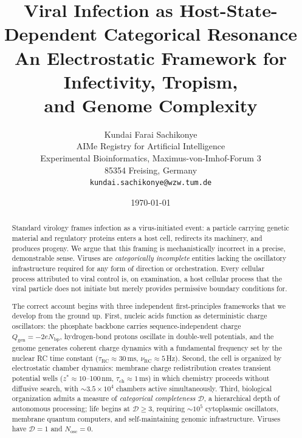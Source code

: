\documentclass[11pt,twocolumn,a4paper]{article}
\title{%
  \textbf{Viral Infection as Host-State-Dependent Categorical Resonance}\\[8pt]
  \large An Electrostatic Framework for Infectivity, Tropism,\\[4pt]
  and Genome Complexity
}
\author{
Kundai Farai Sachikonye\\[0.3em]
AIMe Registry for Artificial Intelligence\\
Experimental Bioinformatics, Maximus-von-Imhof-Forum 3\\
85354 Freising, Germany\\
\texttt{kundai.sachikonye@wzw.tum.de}
}
\date{\today}
\theoremstyle{definition}
\theoremstyle{remark}
\newcommand{\tauRC}{\tau_{\mathrm{RC}}}
\newcommand{\nuRC}{\nu_{\mathrm{RC}}}
\newcommand{\Qgen}{Q_{\mathrm{gen}}}
\newcommand{\Nosc}{N_{\mathrm{osc}}}
\newcommand{\taucham}{\tau_{\mathrm{ch}}}
\newcommand{\zstar}{z^{*}}
\begin{document}

\maketitle
\thispagestyle{empty}

\begin{abstract}
Standard virology frames infection as a virus-initiated event: a particle carrying genetic material and regulatory proteins enters a host cell, redirects its machinery, and produces progeny. We argue that this framing is mechanistically incorrect in a precise, demonstrable sense. Viruses are \emph{categorically incomplete} entities lacking the oscillatory infrastructure required for any form of direction or orchestration. Every cellular process attributed to viral control is, on examination, a host cellular process that the viral particle does not initiate but merely provides permissive boundary conditions for.

The correct account begins with three independent first-principles frameworks that we develop from the ground up. First, nucleic acids function as deterministic charge oscillators: the phosphate backbone carries sequence-independent charge $\Qgen = -2e N_{\mathrm{bp}}$, hydrogen-bond protons oscillate in double-well potentials, and the genome generates coherent charge dynamics with a fundamental frequency set by the nuclear RC time constant ($\tauRC \approx 30$\,ms, $\nuRC \approx 5$\,Hz). Second, the cell is organized by electrostatic chamber dynamics: membrane charge redistribution creates transient potential wells ($\zstar \approx 10$--100\,nm, $\taucham \approx 1$\,ms) in which chemistry proceeds without diffusive search, with $\sim\!3.5\times10^{4}$ chambers active simultaneously. Third, biological organization admits a measure of \emph{categorical completeness} $\mathcal{D}$, a hierarchical depth of autonomous processing; life begins at $\mathcal{D}\geq 3$, requiring $\sim\!10^5$ cytoplasmic oscillators, membrane quantum computers, and self-maintaining genomic infrastructure. Viruses have $\mathcal{D}=1$ and $\Nosc = 0$.


\end{abstract}
\end{document}
